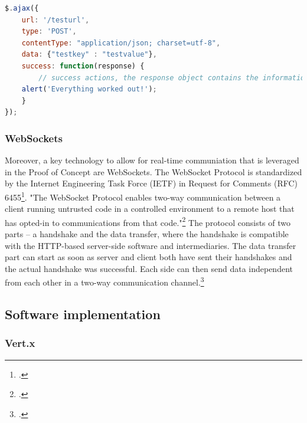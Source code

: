 \begin{lstlisting}[language=javascript,caption={Exemplary jQuery AJAX call},label=lst:jqueryajaxcall]
$.ajax({
    url: '/testurl',
    type: 'POST',
    contentType: "application/json; charset=utf-8",
    data: {"testkey" : "testvalue"},
    success: function(response) {
        // success actions, the response object contains the information sent from the server
	alert('Everything worked out!');
    }
});
\end{lstlisting}

\subsubsection{WebSockets}
Moreover, a key technology to allow for real-time communiation that is leveraged
in the Proof of Concept are WebSockets. The WebSocket Protocol is standardized by the Internet Engineering Task Force (IETF) in Request for Comments (RFC) 6455\footcite[Cf.][]{rfc6455}. "The WebSocket Protocol enables two-way communication between a client running untrusted code in a controlled environment to a remote host that has opted-in to communications from that code."\footcite[.][]{rfc6455} The protocol consists of two parts – a handshake and the data transfer, where the handshake is compatible with the HTTP-based server-side software and intermediaries. The data transfer part can start as soon as server and client both have sent their handshakes and the actual handshake was successful. Each side can then send data independent from each other in a two-way communication channel.\footcite[Cf.][]{rfc6455}



\FloatBarrier
\subsection{Software implementation}
\label{software_implementation}

\subsubsection{Vert.x}
\label{implementation_vertx}

